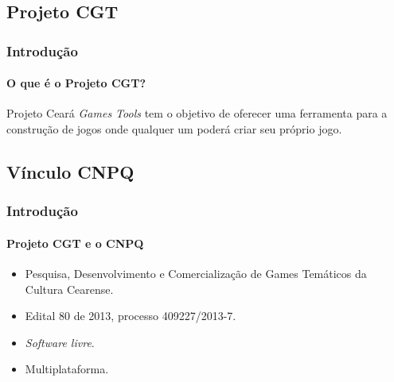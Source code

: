 \documentclass{beamer}
\begin{document}
   \subsection{Projeto CGT}
   \begin{frame}
      \frametitle{Introdução}
      \framesubtitle{O que é o Projeto CGT?}
      Projeto Ceará \emph{Games Tools} tem o objetivo de oferecer uma ferramenta para a construção de jogos onde qualquer um poderá criar seu próprio jogo. \cite{website:projeto-cgt}
   \end{frame}
   \subsection{Vínculo CNPQ}
   \begin{frame}
      \frametitle{Introdução}
      \framesubtitle{Projeto CGT e o CNPQ}
      \begin{itemize}
         \item Pesquisa, Desenvolvimento e Comercialização de Games Temáticos da Cultura Cearense.
         \item Edital 80 de 2013, processo 409227/2013-7.
         \item \emph{Software livre}.
         \item Multiplataforma.
      \end{itemize}
   \end{frame}
\end{document}
